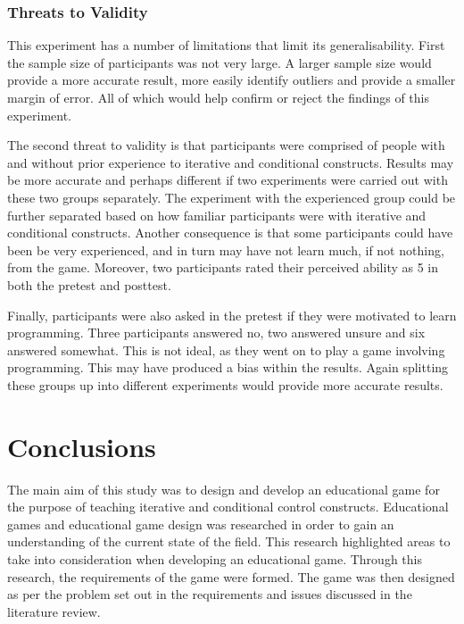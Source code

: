 \documentclass[a4paper,11.5pt]{report}
\numberwithin{figure}{section}
\numberwithin{table}{section}
\numberwithin{equation}{section}
\numberwithin{equation}{section}
\newcommand\blankpage{%
    \null
    \thispagestyle{empty}%
    \addtocounter{page}{-1}%
    \newpage}
\begin{document}
\subsection{Threats to Validity}

This experiment has a number of limitations that limit its generalisability. First the sample size of participants was not very large. A larger sample size would provide a more accurate result, more easily identify outliers and provide a smaller margin of error. All of which would help confirm or reject the findings of this experiment.

The second threat to validity is that participants were comprised of people with and without prior experience to iterative and conditional constructs. Results may be more accurate and perhaps different if two experiments were carried out with these two groups separately. The experiment with the experienced group could be further separated based on how familiar participants were with iterative and conditional constructs. Another consequence is that some participants could have been be very experienced, and in turn may have not learn much, if not nothing, from the game. Moreover, two participants rated their perceived ability as 5 in both the pretest and posttest.

Finally, participants were also asked in the pretest if they were motivated to learn programming. Three participants answered no, two answered unsure and six answered somewhat. This is not ideal, as they went on to play a game involving programming. This may have produced a bias within the results. Again splitting these groups up into different experiments would provide more accurate results.


\afterpage{\blankpage}



\chapter{Conclusions}


The main aim of this study was to design and develop an educational game for the purpose of teaching iterative and conditional control constructs. Educational games and educational game design was researched in order to gain an understanding of the current state of the field. This research highlighted areas to take into consideration when developing an educational game. Through this research, the requirements of the game were formed. The game was then designed as per the problem set out in the requirements and issues discussed in the literature review.
\end{document}
